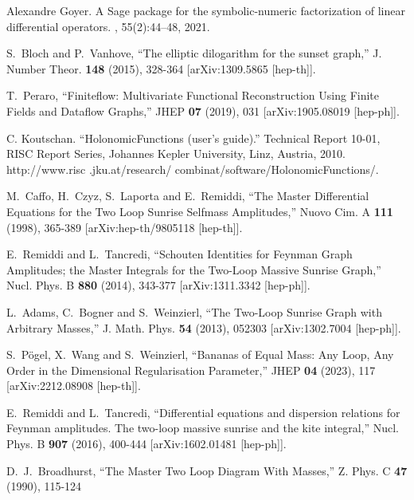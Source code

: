 \documentclass[a4paper,12pt]{article}
\numberwithin{equation}{section}
\numberwithin{figure}{section}
\begin{document}
\begin{thebibliography}{99}
Alexandre Goyer.
\newblock A {S}age package for the symbolic-numeric factorization of linear
  differential operators.
, 55(2):44--48,
2021.

S.~Bloch and P.~Vanhove,
``The elliptic dilogarithm for the sunset graph,''
J. Number Theor. \textbf{148} (2015), 328-364
[arXiv:1309.5865 [hep-th]].
  
T.~Peraro,
``Finiteflow: Multivariate Functional Reconstruction Using Finite Fields and Dataflow Graphs,''
JHEP \textbf{07} (2019), 031
[arXiv:1905.08019 [hep-ph]].


 C. Koutschan. ``HolonomicFunctions (user's guide).'' Technical Report 10-01, RISC Report Series, Johannes Kepler University, Linz, Austria, 2010. http://www.risc
.jku.at/research/ combinat/software/HolonomicFunctions/.

  
M.~Caffo, H.~Czyz, S.~Laporta and E.~Remiddi,
``The Master Differential Equations for the Two Loop Sunrise Selfmass Amplitudes,''
Nuovo Cim. A \textbf{111} (1998), 365-389
[arXiv:hep-th/9805118 [hep-th]].
  
E.~Remiddi and L.~Tancredi,
``Schouten Identities for Feynman Graph Amplitudes; the Master Integrals for the Two-Loop Massive Sunrise Graph,''
Nucl. Phys. B \textbf{880} (2014), 343-377
[arXiv:1311.3342 [hep-ph]].
  
L.~Adams, C.~Bogner and S.~Weinzierl,
``The Two-Loop Sunrise Graph with Arbitrary Masses,''
J. Math. Phys. \textbf{54} (2013), 052303
[arXiv:1302.7004 [hep-ph]].

S.~P\"ogel, X.~Wang and S.~Weinzierl,
``Bananas of Equal Mass: Any Loop, Any Order in the Dimensional Regularisation Parameter,''
JHEP \textbf{04} (2023), 117
[arXiv:2212.08908 [hep-th]].

 

E.~Remiddi and L.~Tancredi,
``Differential equations and dispersion relations for Feynman amplitudes. The two-loop massive sunrise and the kite integral,''
Nucl. Phys. B \textbf{907} (2016), 400-444
[arXiv:1602.01481 [hep-ph]].


D.~J.~Broadhurst,
``The Master Two Loop Diagram With Masses,''
Z. Phys. C \textbf{47} (1990), 115-124
  

\end{thebibliography}
\end{document}

